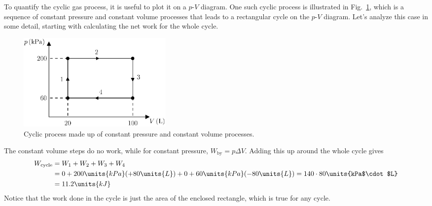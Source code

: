 To quantify the cyclic gas process, it is useful to plot it on a
$p$-$V$ diagram.  One such cyclic process is illustrated in
Fig.~\ref{fig:rectangle_cycle}, which is a sequence of constant
pressure and constant volume processes that leads to a rectangular
cycle on the $p$-$V$ diagram.  Let's analyze this case in some detail,
starting with calculating the net work for the whole cycle.

\begin{figure}
\begin{center}
\includegraphics[width=3in]{heat_engines/rectangle.eps}
\caption{Cyclic process made up of constant pressure and constant volume
processes.}
\label{fig:rectangle_cycle}
\end{center}
\end{figure}

The constant volume steps do no work, while for constant pressure,
$W_\text{by}=p\Delta V$.  Adding this up around the whole cycle gives
\begin{align}
W_\text{cycle} &= W_1 +  W_2 + W_3 + W_4 \nonumber\\
 &= 0 + 200 \units{kPa}(+80\units{L}) + 0 +
 60\units{kPa}(-80\units{L})  = 140\cdot 80 \units{kPa$\cdot$L}\nonumber\\
&= 11.2\units{kJ}
\label{eq:work_for_rectangle}
\end{align}
Notice that the work done in the cycle is just the area of the enclosed
rectangle, which is true for any cycle.

